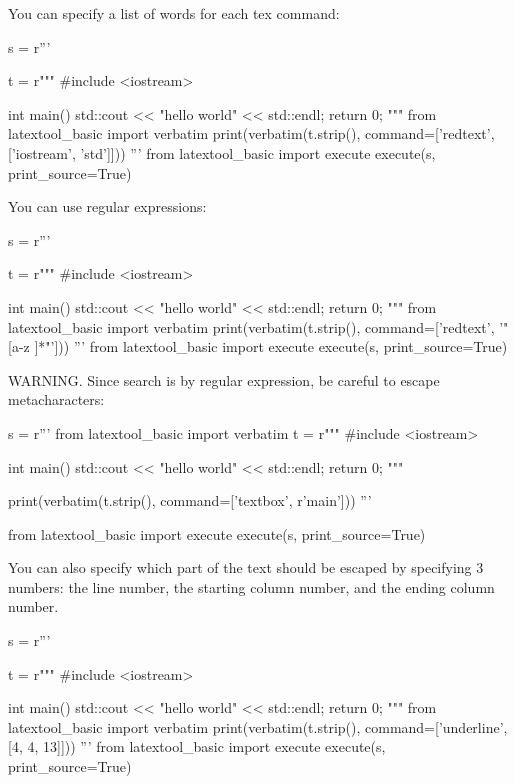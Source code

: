\newpage
You can specify a list of words for each tex command:
\begin{python}
s = r'''

t = r"""
#include <iostream>

int main()
{
    std::cout << "hello world" << std::endl;
    return 0;
}
"""
from latextool_basic import verbatim
print(verbatim(t.strip(), command=['redtext', ['iostream', 'std']]))
'''
from latextool_basic import execute
execute(s, print_source=True)
\end{python}



\newpage


You can use regular expressions:
\begin{python}
s = r'''

t = r"""
#include <iostream>

int main()
{
    std::cout << "hello world" << std::endl;
    return 0;
}"""
from latextool_basic import verbatim
print(verbatim(t.strip(), command=['redtext', '"[a-z ]*"']))
'''
from latextool_basic import execute
execute(s, print_source=True)
\end{python}


\newpage

WARNING.
Since search is by regular expression, 
be careful to escape metacharacters:
\begin{python}
s = r'''
from latextool_basic import verbatim
t = r"""
#include <iostream>

int main()
{
    std::cout << "hello world" << std::endl;
    return 0;
}
"""

print(verbatim(t.strip(), command=['textbox', r'main\(\)']))
'''

from latextool_basic import execute
execute(s, print_source=True)
\end{python}


\newpage

You can also specify which part of the text should be escaped
by specifying 3
numbers: the line number, the starting column number, and the ending
column number.
\begin{python}
s = r'''

t = r"""
#include <iostream>

int main()
{
    std::cout << "hello world" << std::endl;
    return 0;
}
"""
from latextool_basic import verbatim
print(verbatim(t.strip(), command=['underline', [4, 4, 13]]))
'''
from latextool_basic import execute
execute(s, print_source=True)
\end{python}




